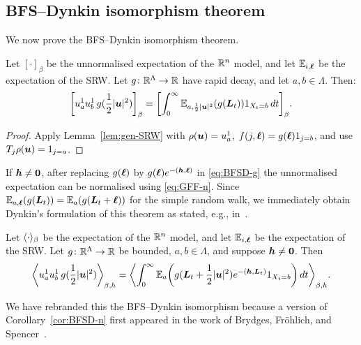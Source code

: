 \documentclass[11pt,a4paper]{article}
\begin{document}
\subsection{BFS--Dynkin isomorphism theorem}
\label{sec:bfs-dynk-isom}


We now prove the BFS--Dynkin isomorphism theorem.

\begin{theorem}
  \label{thm:eucl-dynkin}
  Let $[\cdot]_\beta$ be the unnormalised expectation of the $\mathbb{R}^n$ model, and let $\mathbb{E}_{i,\boldsymbol{\ell}}$ be the expectation of the SRW.
  Let $g\colon \mathbb{R}^\Lambda \to \mathbb{R}$ have rapid decay, and
  let $a,b\in\Lambda$. Then:
  \begin{equation}
    \label{eq:BFSD-g}
    \cb{u_{a}^{1}u_{b}^{1} \,g(\frac{1}{2}|\V{u}|^{2})}_{\beta}
    =
    \cb{\int_0^\infty \E_{a,\frac{1}{2}|\V{u}|^{2}} \pa{g(\V{L}_t)}1_{X_t=b}\, dt }_{\beta}.
  \end{equation}
\end{theorem}
\begin{proof}
  Apply Lemma~\ref{lem:gen-SRW} with $\rho(\boldsymbol{u}) = u_a^1$,
  $f(j,\boldsymbol{\ell}) = g(\boldsymbol{\ell})1_{j=b}$, and use
  $T_j\rho(\boldsymbol{u}) = 1_{j=a}$. 
\end{proof}

If $\boldsymbol{h} \neq \boldsymbol{0}$, after replacing $g(\boldsymbol{\ell})$ by
$g(\boldsymbol{\ell})e^{-(\boldsymbol{h},\boldsymbol{\ell})}$ in \eqref{eq:BFSD-g} the
unnormalised expectation can be normalised using
\eqref{eq:GFF-n}. Since
$\mathbb{E}_{a,\boldsymbol{\ell}}(g(\boldsymbol{L}_t)) = \mathbb{E}_a(g(\boldsymbol{L}_t+\boldsymbol{\ell}))$ for the simple
random walk, we immediately obtain Dynkin's formulation of this
theorem as stated, e.g., in~\cite[Theorem~2.8]{MR2932978}.

\begin{corollary}
  \label{cor:BFSD-n}
  Let $\langle \cdot \rangle_\beta$ be the expectation of the $\mathbb{R}^n$ model, and
  let $\mathbb{E}_{i,\boldsymbol{\ell}}$ be the expectation of the SRW. Let
  $g\colon \mathbb{R}^{\Lambda}\to \mathbb{R}$ be bounded, 
  $a,b\in\Lambda$, and suppose $\boldsymbol{h}\neq \boldsymbol{0}$. Then
  \begin{equation}
    \label{eq:BFSD-c}
    \avga{u_{a}^{1}u_{b}^{1}\, g(\frac{1}{2}|\V{u}|^2)}_{\beta,h} =
    \avga{\int_0^\infty \E_{a} \pa{g(\V{L}_t +
        \frac{1}{2}|\V{u}|^2) e^{-(\V{h},\V{L}_{t})} 
        1_{X_{t}={ b}}
        } \, dt }_{\beta,h}.
  \end{equation}
\end{corollary}

We have rebranded this the BFS--Dynkin isomorphism because a version
of Corollary~\ref{cor:BFSD-n} first appeared in the work of Brydges,
Fr\"{o}hlich, and Spencer~\cite[Theorem~2.2]{MR648362}.
\end{document}
